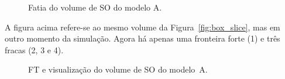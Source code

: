 \begin{figure}[h]
	\centering
	\caption{Fatia do volume de SO do modelo A.}
	\label{fig:r_vrep_2_slice}
\end{figure}

	A figura acima refere-se ao mesmo volume da Figura~\ref{fig:box_slice}, mas em outro momento da simulação. Agora há apenas uma fronteira forte (1) e três fracas (2, 3 e 4).

\begin{figure}[h]
	\centering
	\caption{FT e visualização do volume de SO do modelo~A.}
	\label{fig:r_vrep_2}
\end{figure}

